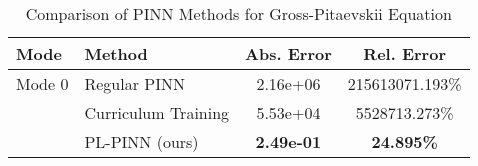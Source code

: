 \begin{table}[htbp]
\centering
\caption{Comparison of PINN Methods for Gross-Pitaevskii Equation}
\label{tab:pinn_comparison}
\begin{tabular}{llcc}
\toprule
Mode & Method & Abs. Error & Rel. Error \\
\midrule
Mode 0 & Regular PINN & 2.16e+06 & 215613071.193\% \\
 & Curriculum Training & 5.53e+04 & 5528713.273\% \\
 & PL-PINN (ours) & \textbf{2.49e-01} & \textbf{24.895\%} \\
\bottomrule
\end{tabular}
\end{table}